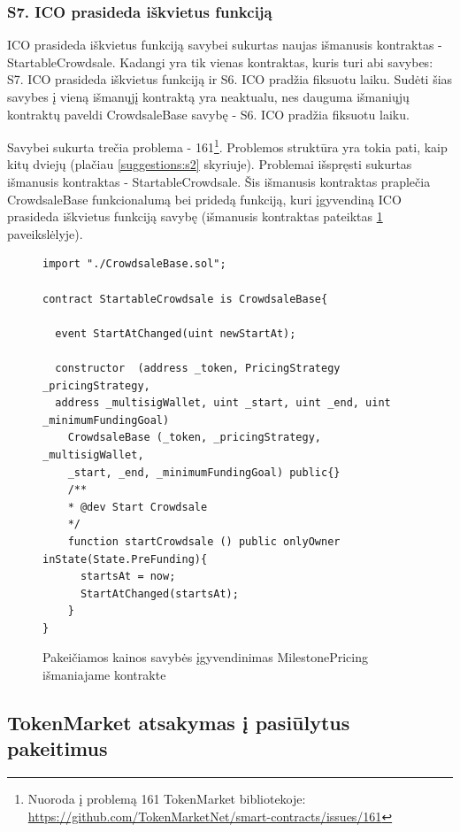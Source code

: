 \documentclass{VUMIFPSbakalaurinis}
\begin{document}
\subsubsection{S7. ICO prasideda iškvietus funkciją}

ICO prasideda iškvietus funkciją savybei sukurtas naujas išmanusis kontraktas - StartableCrowdsale. Kadangi yra tik vienas kontraktas, kuris turi abi savybes: S7. ICO prasideda iškvietus funkciją ir S6. ICO pradžia fiksuotu laiku. Sudėti šias savybes į vieną išmanųjį kontraktą yra neaktualu, nes dauguma išmaniųjų kontraktų paveldi CrowdsaleBase savybę - S6. ICO pradžia fiksuotu laiku.

Savybei sukurta trečia problema - 161\footnote{Nuoroda į problemą 161 TokenMarket bibliotekoje: \url{https://github.com/TokenMarketNet/smart-contracts/issues/161}}. Problemos struktūra yra tokia pati, kaip kitų dviejų (plačiau \ref{suggestions:s2} skyriuje). Problemai išspręsti sukurtas išmanusis kontraktas  - StartableCrowdsale. Šis išmanusis kontraktas praplečia CrowdsaleBase funkcionalumą bei pridedą funkciją, kuri įgyvendiną ICO prasideda iškvietus funkciją savybę (išmanusis kontraktas pateiktas \ref{code:s7} paveikslėlyje).


\begin{figure}[H]
    \small
	\begin{lstlisting}
import "./CrowdsaleBase.sol";

contract StartableCrowdsale is CrowdsaleBase{

  event StartAtChanged(uint newStartAt);

  constructor  (address _token, PricingStrategy _pricingStrategy,
  address _multisigWallet, uint _start, uint _end, uint _minimumFundingGoal)
    CrowdsaleBase (_token, _pricingStrategy, _multisigWallet,
    _start, _end, _minimumFundingGoal) public{}
    /**
    * @dev Start Crowdsale
    */
    function startCrowdsale () public onlyOwner inState(State.PreFunding){
      startsAt = now;
      StartAtChanged(startsAt);
    }
}

\end{lstlisting}
	\caption{Pakeičiamos kainos savybės įgyvendinimas MilestonePricing išmaniajame kontrakte}
	\label{code:s7}
\end{figure}


\subsection{TokenMarket atsakymas į pasiūlytus pakeitimus}
\end{document}
